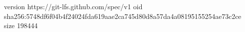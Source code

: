 version https://git-lfs.github.com/spec/v1
oid sha256:5748df6f04b4f24024fda619aae2ca745d80d8a57da4a08195155254ae73c2ce
size 198444
